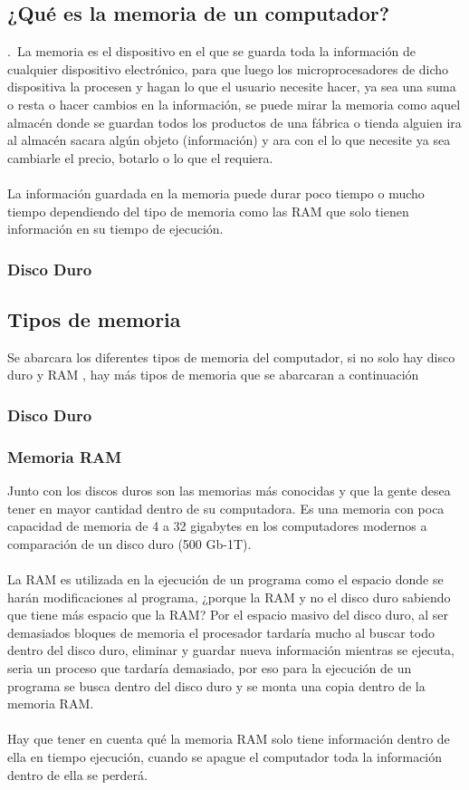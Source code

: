\documentclass{article}
\begin{document}
\subsection{¿Qué es la memoria de un computador?}
 .\
	La memoria es el dispositivo en el que se guarda toda la información de cualquier dispositivo electrónico, para que luego los microprocesadores de dicho dispositiva la procesen y hagan lo que el usuario necesite hacer, ya sea una suma o resta o hacer cambios en la información, se puede mirar la memoria como aquel almacén donde se guardan todos los productos de una fábrica o tienda alguien ira al almacén sacara algún objeto (información) y ara con el lo que necesite ya sea cambiarle el precio, botarlo o lo que el requiera.
	\\\\
La información guardada en la memoria puede durar poco tiempo o mucho tiempo dependiendo del tipo de memoria como las RAM que solo  tienen información en su tiempo de ejecución.

\subsubsection{Disco Duro}
\subsection{Tipos de memoria}
Se abarcara los diferentes tipos de memoria del computador, si no solo hay disco duro y RAM , hay más tipos de memoria que se abarcaran a continuación 
\subsubsection{Disco Duro}
\subsubsection{Memoria RAM}
Junto con los discos duros son las memorias más conocidas y que la gente desea tener en mayor cantidad dentro de su computadora. Es una memoria con poca capacidad de memoria de 4 a 32 gigabytes en los computadores modernos a comparación de un disco duro (500 Gb-1T).
\\\\
La RAM es utilizada en la ejecución de un programa como el espacio donde se harán modificaciones al programa, ¿porque la RAM y no el disco duro sabiendo que tiene más espacio que la RAM? Por el espacio masivo del disco duro, al ser demasiados bloques de memoria el procesador tardaría mucho al buscar todo dentro del disco duro, eliminar y guardar nueva información mientras se ejecuta, seria un proceso que tardaría demasiado, por eso para la ejecución de un programa se busca dentro del disco duro y se monta una copia dentro de la memoria RAM.
\\\\
Hay que tener en cuenta qué la memoria RAM solo tiene información dentro de ella en tiempo ejecución, cuando se apague el computador toda la información dentro de ella se perderá.








\end{document}
